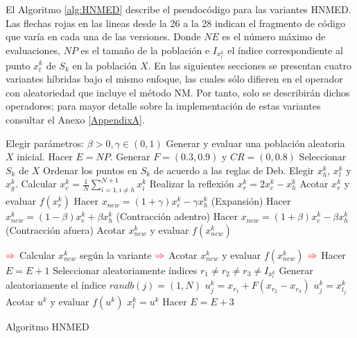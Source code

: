 El Algoritmo \ref{alg:HNMED} describe el pseudocódigo para las variantes HNMED. Las flechas rojas en las lineas desde la 26 a la 28 indican el fragmento de código que varía en cada una de las versiones. Donde $NE$ es el número máximo de evaluaciones, $NP$ es el tamaño de la población e $I_{x_l^k}$ el índice correspondiente al punto $x_l^k$ de $S_k$ en la población $X$. En las siguientes secciones se presentan cuatro variantes híbridas bajo el mismo enfoque, las cuales sólo difieren en el operador con aleatoriedad que incluye el método NM. Por tanto, solo se describirán dichos operadores; para mayor detalle sobre la implementación de estas variantes consultar el Anexo \ref{AppendixA}. 


\begin{algorithm}
	\begin{algorithmic}[1]
		\STATE Elegir parámetros: $\beta>0, \gamma \in (0,1)$
		\STATE Generar y evaluar una población aleatoria $X$ inicial.
        \STATE Hacer $E=NP$.
           \STATE Generar $F=(0.3,0.9)$ y $CR=(0,0.8)$
              \STATE Seleccionar $S_k$ de $X$
              \STATE Ordenar los puntos en $S_k$ de acuerdo a las reglas de Deb.
              \STATE Elegir $x^k_h$, $x^k_l$ y $x^k_g$.
              \STATE Calcular $x^k_c=\frac{1}{N} \sum_{i=1, i\neq h }^{N+1} x^k_i$
              \STATE Realizar la reflexión $x^k_r=2x^k_c -x^k_h$
              \STATE Acotar  $x^k_r$ y evaluar  $f(x^k_r)$
              \STATE Hacer $x_{new}=(1+\gamma)x^k_c-\gamma x^k_h$ (Expansión)
              \ELSE {}
              \STATE Hacer $x^k_{new}=(1-\beta)x^k_c+\beta x^k_h$ (Contracción adentro)
              \ENDIF
              \ELSE {}
              \STATE Hacer $x_{new}=(1+\beta)x^k_c-\beta x^k_h$ (Contracción afuera)
              \ENDIF
              \ENDIF
              \STATE Acotar $x^k_{new}$ y evaluar $f(x^k_{new})$
            

              \STATE $\color{red} \Rightarrow $  Calcular $x^k_{new}$ según la variante  
              \STATE $\color{red} \Rightarrow $ Acotar  $x^k_{new}$ y evaluar  $f(x^k_{new})$  
              \STATE $\color{red} \Rightarrow $ Hacer  $E=E+1$ 
              \ENDIF
              \STATE Seleccionar aleatoriamente índices $r_1 \neq r_2 \neq r_3 \neq I_{x^k_l} $
              \STATE Generar aleatoriamente el índice $randb(j)=(1,N)$ 
              	   \STATE $u^k_{j} = x_{r_1} + F (x_{r_2}-x_{r_3})$
              	\ELSE 
                  \STATE $u^k_{j} = x^k_{l_j}$
                \ENDIF
              \ENDFOR
             \STATE Acotar $u^k$ y evaluar $f(u^k)$
                  \STATE $x^k_l = u^k$
               \ENDIF
                 \STATE Hacer  $E=E+3$
        \ENDFOR
		\ENDWHILE
	\end{algorithmic}
	\caption{Algoritmo HNMED}\label{alg:HNMED}
\end{algorithm}

